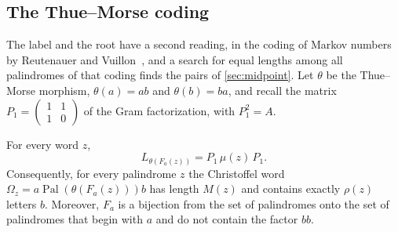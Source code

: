 \subsection{The Thue--Morse coding}
\label{subsec:thue-morse}

The label and the root have a second reading, in the coding of Markov numbers by Reutenauer
and Vuillon~\cite{ReutenauerVuillon2017}, and a search for equal lengths among all palindromes of
that coding finds the pairs of \cref{sec:midpoint}. Let $\theta$ be
the Thue--Morse morphism, $\theta(a)=ab$ and $\theta(b)=ba$, and recall the matrix
$P_1=\left(\begin{smallmatrix}1&1\\1&0\end{smallmatrix}\right)$ of the Gram factorization, with
$P_1^2=A$.

\begin{proposition}
\label{prop:thue-morse}
For every word $z$,
\begin{equation}\label{eq:thue-morse-incidence}
 L_{\theta(F_a(z))}=P_1\,\mu(z)\,P_1 .
\end{equation}
Consequently, for every palindrome $z$ the Christoffel word
$\Omega_z=a\operatorname{Pal}(\theta(F_a(z)))b$ has length $M(z)$ and contains exactly
$\rho(z)$ letters $b$. Moreover, $F_a$ is a bijection from the set of palindromes onto the
set of palindromes that begin with $a$ and do not contain the factor $bb$.
\end{proposition}

